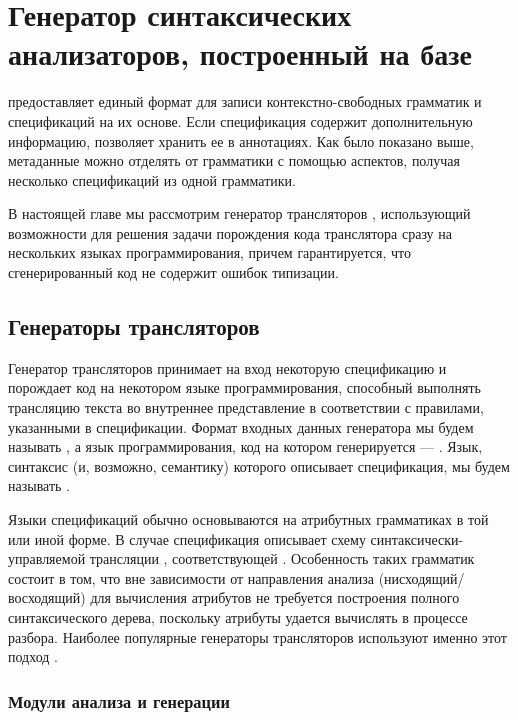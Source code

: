 \part{Генератор синтаксических анализаторов, построенный на базе \GRM{}}\label{part3}

\GRM{} предоставляет единый формат для записи контекстно-свободных грамматик и спецификаций на их основе. Если спецификация содержит дополнительную информацию, \GRM{} позволяет хранить ее в аннотациях. Как было показано выше, метаданные можно отделять от грамматики с помощью аспектов, получая несколько спецификаций из одной грамматики.

В настоящей главе мы рассмотрим генератор трансляторов \ATF{}, использующий возможности \GRM{} для решения задачи порождения кода транслятора сразу на нескольких языках программирования, причем гарантируется, что сгенерированный код не содержит ошибок типизации.

\chapter{Генераторы трансляторов}

Генератор трансляторов принимает на вход некоторую спецификацию и порождает код на некотором языке программирования, способный выполнять трансляцию текста во внутреннее представление в соответствии с правилами, указанными в спецификации.
Формат входных данных генератора мы будем называть , а язык программирования, код на котором генерируется --- . Язык, синтаксис (и, возможно, семантику) которого описывает спецификация, мы будем называть .

Языки спецификаций обычно основываются на атрибутных грамматиках \cite{???Knuth} в той или иной форме. В случае \ATF{} спецификация описывает схему синтаксически-управляемой трансляции \cite{???Dragon}, соответствующей  \cite{???}. Особенность таких грамматик состоит в том, что вне зависимости от направления анализа (нисходящий/восходящий) для вычисления атрибутов не требуется построения полного синтаксического дерева, поскольку атрибуты удается вычислять в процессе разбора. Наиболее популярные генераторы трансляторов используют именно этот подход \cite{???}.

\section{Модули анализа и генерации}

